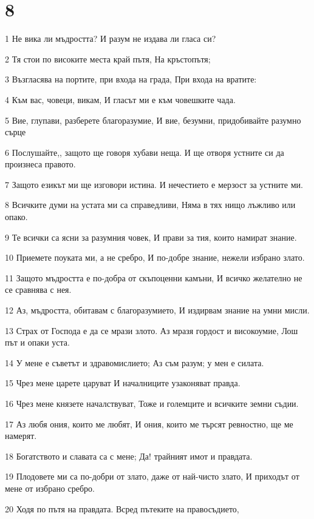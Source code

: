 \chapter{8}

\par 1 Не вика ли мъдростта? И разум не издава ли гласа си?
\par 2 Тя стои по високите места край пътя, На кръстопътя;
\par 3 Възгласява на портите, при входа на града, При входа на вратите:
\par 4 Към вас, човеци, викам, И гласът ми е към човешките чада.
\par 5 Вие, глупави, разберете благоразумие, И вие, безумни, придобивайте разумно сърце
\par 6 Послушайте,, защото ще говоря хубави неща. И ще отворя устните си да произнеса правото.
\par 7 Защото езикът ми ще изговори истина. И нечестието е мерзост за устните ми.
\par 8 Всичките думи на устата ми са справедливи, Няма в тях нищо лъжливо или опако.
\par 9 Те всички са ясни за разумния човек, И прави за тия, които намират знание.
\par 10 Приемете поуката ми, а не сребро, И по-добре знание, нежели избрано злато.
\par 11 Защото мъдростта е по-добра от скъпоценни камъни, И всичко желателно не се сравнява с нея.
\par 12 Аз, мъдростта, обитавам с благоразумието, И издирвам знание на умни мисли.
\par 13 Страх от Господа е да се мрази злото. Аз мразя гордост и високоумие, Лош път и опаки уста.
\par 14 У мене е съветът и здравомислието; Аз съм разум; у мен е силата.
\par 15 Чрез мене царете царуват И началниците узаконяват правда.
\par 16 Чрез мене князете началствуват, Тоже и големците и всичките земни съдии.
\par 17 Аз любя ония, които ме любят, И ония, които ме търсят ревностно, ще ме намерят.
\par 18 Богатството и славата са с мене; Да! трайният имот и правдата.
\par 19 Плодовете ми са по-добри от злато, даже от най-чисто злато, И приходът от мене от избрано сребро.
\par 20 Ходя по пътя на правдата. Всред пътеките на правосъдието,
